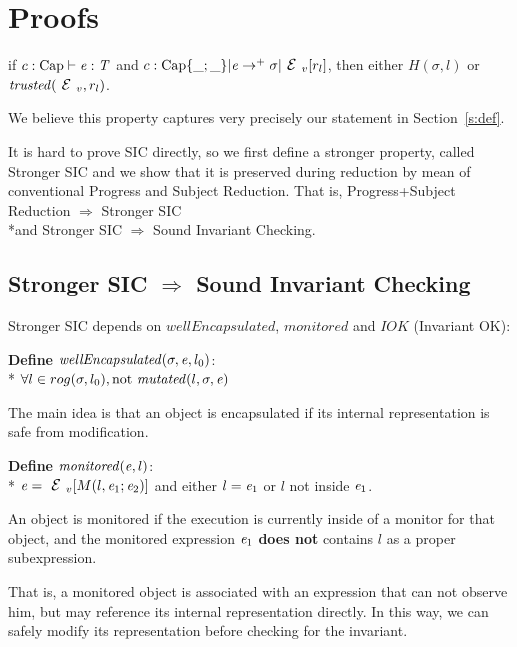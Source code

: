 \appendix
\section{Proofs} 

\begin{Theorem}
if $c:\text{Cap}\vdash {\ensuremath{\mathit{e}}}: {\mathit{T}}$ and
$c:\text{Cap}\{\_;\_\}|\e\rightarrow^+ \sigma|\ctx_v[r_l]$, then
either $H(\sigma,l)$ or $\mathit{trusted}(\ctx_v,r_l)$.
\end{Theorem}

We believe this property captures very precisely our statement in Section~\ref{s:def}.

It is hard to prove SIC directly,
so we first define a stronger property,
called Stronger SIC and
we show that it is preserved during reduction by mean of conventional Progress and Subject Reduction.
That is,
Progress+Subject Reduction $\Rightarrow$ Stronger SIC
\\*and Stronger SIC $\Rightarrow$ Sound Invariant Checking.

\subsection{Stronger SIC $\Rightarrow$ Sound Invariant Checking}

Stronger SIC depends on 
$\mathit{wellEncapsulated}$, $\mathit{monitored}$
and $IOK$ (Invariant OK):

\noindent\textbf{Define} $\mathit{wellEncapsulated}(\sigma,\e,l_0)$:\\*
${}_{}$\quad\quad$\forall l \in rog(\sigma,l_0), \text{not}\ \mathit{mutated}(l,\sigma,\e)$

\noindent The main idea is that an object is encapsulated if its internal representation is safe from
modification. 

\noindent\textbf{Define} $\mathit{monitored}({\mathit{e}},l)$:\\*
${}_{}$\quad\quad  $\e=\ctx_v[M(l,\e_1;\e_2)]$ and either $l={\mathit{e}}_1$ or $l$ not inside ${\mathit{e}}_1$.

\noindent An object is monitored if the execution
is currently inside of a monitor for that object, and
the monitored expression ${\mathit{e}}_1$ \textbf{does not}
contains $l$ as a proper subexpression.

That is, a monitored object is associated with an expression that can not observe him, but may 
reference its internal representation directly.
In this way, we can safely modify its representation before checking for the invariant.

